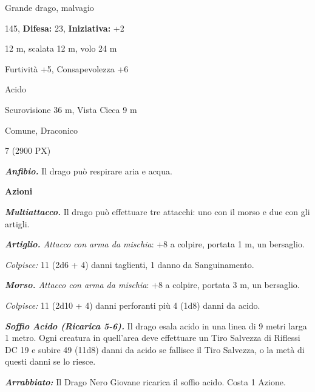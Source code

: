 \begin{multicols}{2}
{
\noindent
\begin{description}[noitemsep, topsep=0pt, parsep=0pt, partopsep=0pt, leftmargin=0cm, labelwidth=2.2cm]
	\item[\textbf{Taglia/Tipo:}] Grande drago, malvagio
	\item[\textbf{Caratt.:}] 
	\item[\textbf{Punti Ferita:}] 145,  \textbf{Difesa:} 23,  \textbf{Iniziativa:} +2
	\item[\textbf{Movimento:}] 12 m, scalata 12 m, volo 24 m
	\item[\textbf{Tiri Salvez.:}] 
	\item[\textbf{Comp.:}] Furtività +5, Consapevolezza +6
	\item[\textbf{Imm. Danni:}] Acido
	\item[\textbf{Sensi:}] Scurovisione 36 m, Vista Cieca 9 m
	\item[\textbf{Linguaggi:}] Comune, Draconico
	\item[\textbf{Sfida:}] 7 (2900 PX)\smallskip
\end{description}

\emph{\textbf{Anfibio.}} Il drago può respirare aria e acqua.

\textbf{Azioni}

\emph{\textbf{Multiattacco.}} Il drago può effettuare tre attacchi: uno con il morso e due con gli artigli.

\emph{\textbf{Artiglio.} Attacco con arma da mischia}: +8 a colpire, portata 1 m, un bersaglio.

\emph{Colpisce:} 11 (2d6 + 4) danni taglienti, 1 danno da Sanguinamento.

\emph{\textbf{Morso.} Attacco con arma da mischia}: +8 a colpire, portata 3 m, un bersaglio.

\emph{Colpisce:} 11 (2d10 + 4) danni perforanti più 4 (1d8) danni da acido.

\emph{\textbf{Soffio Acido (Ricarica 5-6).}} Il drago esala acido in una linea di 9 metri larga 1 metro. Ogni creatura in quell'area deve effettuare un Tiro Salvezza di Riflessi DC 19 e subire 49 (11d8) danni da acido se fallisce il Tiro Salvezza, o la metà di questi danni se lo riesce.

\emph{\textbf{Arrabbiato:}} Il Drago Nero Giovane ricarica il soffio acido. Costa 1 Azione.

}
\end{multicols}
